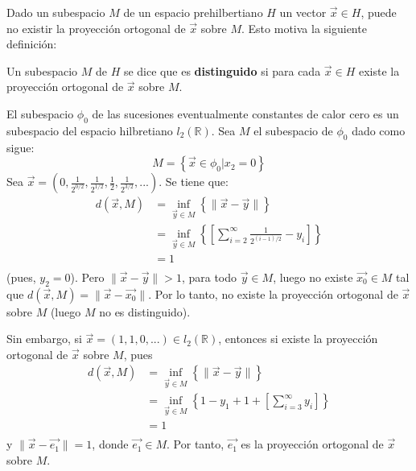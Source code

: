 \documentclass[12pt]{report}
\theoremstyle{largebreak}
\newcommand\norm[1]{\ensuremath{\|#1\|}}
\begin{document}
    Dado un subespacio $M$ de un espacio prehilbertiano $H$ un vector $\vec{x}\in H$, puede no existir la proyección ortogonal de $\vec{x}$ sobre $M$. Esto motiva la siguiente definición:

    \begin{mydef}
        Un subespacio $M$ de $H$ se dice que es \textbf{distinguido} si para cada $\vec{x}\in H$ existe la proyección ortogonal de $\vec{x}$ sobre $M$.        
    \end{mydef}

    \begin{exa}
        El subespacio $\phi_0$ de las sucesiones eventualmente constantes de calor cero es un subespacio del espacio hilbretiano $l_2(\mathbb{R})$. Sea $M$ el subespacio de $\phi_0$ dado como sigue:
        \begin{equation*}
            M=\left\{\vec{x}\in\phi_0|x_2=0 \right\}
        \end{equation*}
        Sea $\vec{x}=\left(0,\frac{1}{2^{0/2}},\frac{1}{2^{1/2}},\frac{1}{2},\frac{1}{2^{3/2}},... \right)$. Se tiene que:
        \begin{equation*}
            \begin{split}
                d(\vec{x},M)&=\inf_{\vec{y}\in M}\left\{\norm{\vec{x}-\vec{y}} \right\}\\
                &=\inf_{\vec{y}\in M}\left\{\left[\sum_{i=2}^{\infty} \frac{1}{2^{(i-1)/2}}-y_i \right] \right\}\\
                &=1\\
            \end{split}
        \end{equation*}
        (pues, $y_2=0$). Pero $\norm{\vec{x}-\vec{y}}>1$, para todo $\vec{y}\in M$, luego no existe $\vec{x_0}\in M$ tal que $d(\vec{x},M)=\norm{\vec{x}-\vec{x_0}}$. Por lo tanto, no existe la proyección ortogonal de $\vec{x}$ sobre $M$ (luego $M$ no es distinguido).

        Sin embargo, si $\vec{x}=(1,1,0,...)\in l_2(\mathbb{R})$, entonces si existe la proyección ortogonal de $\vec{x}$ sobre $M$, pues
        \begin{equation*}
            \begin{split}
                d(\vec{x},M)&=\inf_{\vec{y}\in M}\left\{\norm{\vec{x}-\vec{y}} \right\}\\
                &=\inf_{\vec{y}\in M}\left\{1-y_1+1+\left[\sum_{i=3}^{\infty} y_i \right] \right\}\\
                &=1\\
            \end{split}
        \end{equation*}
        y $\norm{\vec{x}-\vec{e_1}}=1$, donde $\vec{e_1}\in M$. Por tanto, $\vec{e_1}$ es la proyección ortogonal de $\vec{x}$ sobre $M$.
    \end{exa}
\end{document}
